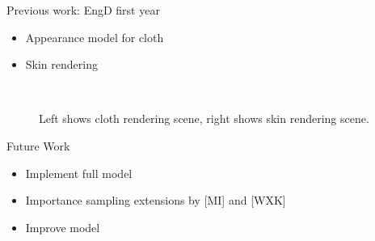 \documentclass{beamer}
\begin{document}
\begin{frame}{Previous work: EngD first year}
\begin{multicols}{2}
\begin{itemize}
\setlength\itemsep{0.5em}
\item Appearance model for cloth
\item Skin rendering
\end{itemize}
\end{multicols}
\begin{center}
\begin{figure}
~
\caption*{\tiny{Left shows cloth rendering scene, right shows skin rendering scene.}}
\end{figure}
\end{center}
\end{frame}

\begin{frame}{Future Work}
\begin{itemize}
\item Implement full model
\item Importance sampling extensions by [MI] and [WXK]
\item Improve model
\end{itemize}
\end{frame}

\section*{}
\end{document}
